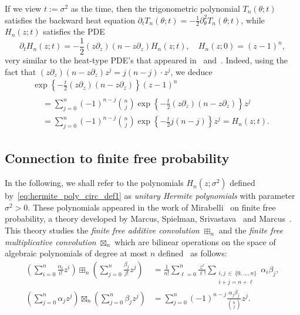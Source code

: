 \documentclass[AHL,Unicode,longabstracts,published]{cedram}
\begin{document}
If we view $t := \sigma^2$ as the time, then the trigonometric polynomial $T_n(\theta; t)$ satisfies the backward heat equation $\partial_t T_n(\theta; t) = -\frac 12 \partial_\theta^2 T_n(\theta; t)$, while $H_n(z;t)$ satisfies the PDE
\[
\partial_t H_n(z; t) = - \frac 12 (z \partial_z) (n- z\partial_z) H_n(z;t),
\quad H_n(z; 0) = (z-1)^n,
\]
very similar to the heat-type PDE's that appeared in~\cite{tao_blog2} and~\cite[Section~2.3]{hall_ho}. Indeed, using the fact that $(z \partial_z) (n- z\partial_z) z^j = j(n-j) \cdot z^j$, we deduce
\begin{multline*}
\exp\left\{-\frac t2 (z \partial_z) (n- z\partial_z)\right\} (z-1)^n \\
\begin{aligned}
&=
\sum_{j=0}^n (-1)^{n-j} \binom nj \exp\left\{-\frac t2 (z \partial_z) (n- z\partial_z)\right\} z^j\\
&=
\sum_{j=0}^n (-1)^{n-j} \binom nj \exp\left\{ - \frac {t}{2} j (n-j)\right\} z^j = H_n(z;t).
\end{aligned}
\end{multline*}



\subsection{Connection to finite free probability} In the following, we shall refer to the polynomials $H_n(z; \sigma^2)$ defined by~\eqref{eq:hermite_poly_circ_def1} as \emph{unitary Hermite polynomials} with parameter $\sigma^2>0$. These polynomials appeared in the work of Mirabelli~\cite{mirabelli_diss} on finite free probability, a theory developed by Marcus, Spielman, Srivastava~\cite{marcus_spielman_srivastava} and Marcus~\cite{marcus}. This theory studies the \emph{finite free additive convolution} $\boxplus_{n}$ and the \emph{finite free multiplicative convolution} $\boxtimes_{n}$ which are bilinear operations on the space of algebraic polynomials of degree at most $n$ defined~\cite{marcus,marcus_spielman_srivastava} as follows:
\begin{align}
\left(\sum_{i=0}^{n} \frac{\alpha_i}{i!} z^i \right)\boxplus_{n}\left(\sum_{j=0}^{n} \frac{\beta_j}{j!} z^j \right) &=
\frac 1 {n!} \sum_{\ell=0}^{n} \frac{z^\ell}{\ell!} \sum_{\substack{i,j\,\in\,\{0,\ldots, n\}\\ i+j=n+\ell}} \alpha_i \beta_j, \label{eq:finite_free_add_conv_def}
\\
\left(\sum_{j=0}^{n} \alpha_j z^j \right)\boxtimes_{n}\left(\sum_{j=0}^{n} \beta_j z^j \right) &=
\sum_{j=0}^{n} (-1)^{n-j} \frac{\alpha_j \beta_j}{\binom {n}{j}} z^j. \label{eq:finite_free_mult_conv_def}
\end{align}
\end{document}
